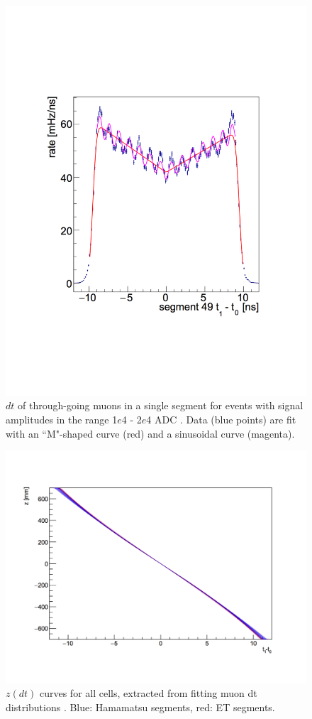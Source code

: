 \begin{figure}
\begin{minipage}[t]{0.5\linewidth}
		\includegraphics[width=0.85\linewidth]{tex/5-analysis-images/HobbesFit}
		\caption[Muon $dt$ for a single segment]{$dt$ of through-going muons in a single segment for events with signal amplitudes in the range  1$e$4 -  2$e$4 ADC \cite{MM:2314}. Data (blue points) are fit with an ``M"-shaped curve (red) and a sinusoidal curve (magenta).}
		\label{fig:hobbesfit}
	\end{minipage}
\end{figure}

\begin{figure}[H]
	\centering
	\includegraphics[width=0.5\linewidth]{tex/5-analysis-images/z_vs_dt}
	\caption[$z(dt)$ curves for all cells]{$z(dt)$ curves for all cells, extracted from fitting muon dt distributions \cite{MM:2314}. Blue: Hamamatsu segments, red: ET segments.}
	\label{fig:zvsdt}
\end{figure}

